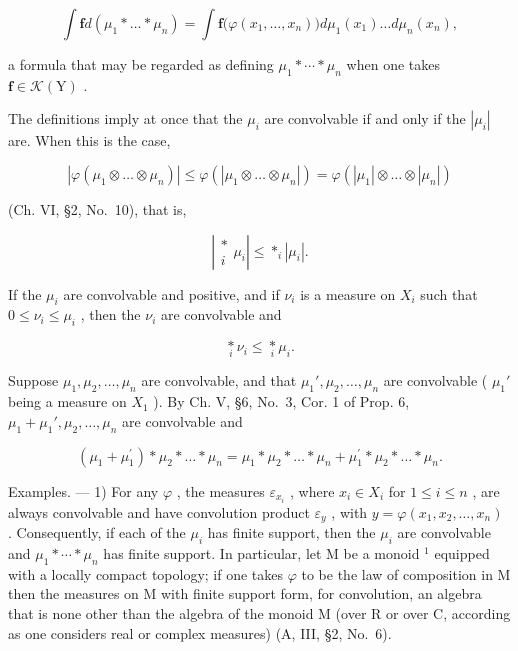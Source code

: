 \[
\int \mathbf {f} d (\mu_ {1} * \dots * \mu_ {n}) = \int \mathbf {f} \big (\varphi (x _ {1}, \ldots , x _ {n}) \big) d \mu_ {1} (x _ {1}) \ldots d \mu_ {n} (x _ {n}),\tag{1}
\]

a formula that may be regarded as defining \(\mu_{1}*\cdots *\mu_{n}\) when one takes \(\mathbf{f}\in\mathcal{K}(\mathrm{Y})\) .

The definitions imply at once that the \(\mu_{i}\) are convolvable if and only if the \(|\mu_{i}|\) are. When this is the case,

\[
\left| \varphi \left(\mu_ {1} \otimes \dots \otimes \mu_ {n}\right) \right| \leqslant \varphi \left(\left| \mu_ {1} \otimes \dots \otimes \mu_ {n} \right|\right) = \varphi \left(\left| \mu_ {1} \right| \otimes \dots \otimes \left| \mu_ {n} \right|\right)
\]

(Ch. VI, §2, No.~10), that is,

\[
\left| \begin{array}{c} * \\ i \end{array} \mu_ {i} \right| \leqslant * _ {i} | \mu_ {i} |.\tag{2}
\]

If the \(\mu_{i}\) are convolvable and positive, and if \(\nu_{i}\) is a measure on \(X_{i}\) such that \(0 \leqslant \nu_{i} \leqslant \mu_{i}\) , then the \(\nu_{i}\) are convolvable and

\[
\underset {i} {\ast} \nu_ {i} \leqslant \underset {i} {\ast} \mu_ {i}.
\]

Suppose \(\mu_1, \mu_2, \ldots, \mu_n\) are convolvable, and that \(\mu_1', \mu_2, \ldots, \mu_n\) are convolvable ( \(\mu_1'\) being a measure on \(X_1\) ). By Ch. V, §6, No.~3, Cor. 1 of Prop. 6, \(\mu_1 + \mu_1', \mu_2, \ldots, \mu_n\) are convolvable and

\[
\left(\mu_ {1} + \mu_ {1} ^ {\prime}\right) * \mu_ {2} * \dots * \mu_ {n} = \mu_ {1} * \mu_ {2} * \dots * \mu_ {n} + \mu_ {1} ^ {\prime} * \mu_ {2} * \dots * \mu_ {n}.
\]

Examples. --- 1) For any \(\varphi\) , the measures \(\varepsilon_{x_i}\) , where \(x_i \in X_i\) for \(1 \leqslant i \leqslant n\) , are always convolvable and have convolution product \(\varepsilon_y\) , with \(y = \varphi(x_1, x_2, \ldots, x_n)\) . Consequently, if each of the \(\mu_i\) has finite support, then the \(\mu_i\) are convolvable and \(\mu_1 * \cdots * \mu_n\) has finite support. In particular, let M be a monoid \(^1\) equipped with a locally compact topology; if one takes \(\varphi\) to be the law of composition in M then the measures on M with finite support form, for convolution, an algebra that is none other than the algebra of the monoid M (over R or over C, according as one considers real or complex measures) (A, III, §2, No.~6).

